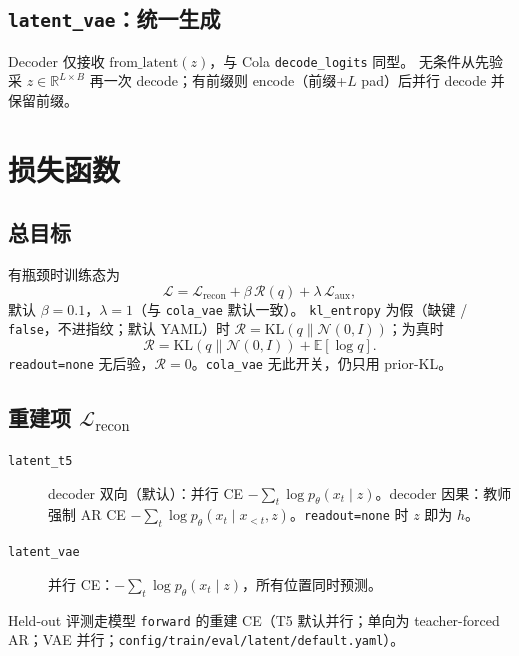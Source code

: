 \documentclass[UTF8,a4paper,11pt]{ctexart}
\begin{document}
\subsection{\texttt{latent\_vae}：统一生成}

Decoder 仅接收 $\mathrm{from\_latent}(z)$，与 Cola \texttt{decode\_logits} 同型。
无条件从先验采 $z\in\mathbb{R}^{L\times B}$ 再一次 decode；有前缀则 encode（前缀+$L$ pad）后并行 decode 并保留前缀。

\section{损失函数}

\subsection{总目标}

有瓶颈时训练态为
\begin{equation}
  \mathcal{L} = \mathcal{L}_{\mathrm{recon}} + \beta\,\mathcal{R}(q) + \lambda\, \mathcal{L}_{\mathrm{aux}},
\end{equation}
默认 $\beta{=}0.1$，$\lambda{=}1$（与 \texttt{cola\_vae} 默认一致）。
\texttt{kl\_entropy} 为假（缺键 / \texttt{false}，不进指纹；默认 YAML）时 $\mathcal{R}=\mathrm{KL}(q\| \mathcal{N}(0,I))$；为真时
\begin{equation}
  \mathcal{R}=\mathrm{KL}(q\| \mathcal{N}(0,I))+\mathbb{E}[\log q].
\end{equation}
\texttt{readout=none} 无后验，$\mathcal{R}=0$。\texttt{cola\_vae} 无此开关，仍只用 prior-KL。

\subsection{重建项 $\mathcal{L}_{\mathrm{recon}}$}

\begin{description}
  \item[\texttt{latent\_t5}] decoder 双向（默认）：并行 CE $-\sum_t \log p_\theta(x_t \mid z)$。decoder 因果：教师强制 AR CE $-\sum_t \log p_\theta(x_t \mid x_{<t}, z)$。\texttt{readout=none} 时 $z$ 即为 $h$。
  \item[\texttt{latent\_vae}] 并行 CE：$-\sum_t \log p_\theta(x_t \mid z)$，所有位置同时预测。
\end{description}

Held-out 评测走模型 \texttt{forward} 的重建 CE（T5 默认并行；单向为 teacher-forced AR；VAE 并行；\texttt{config/train/eval/latent/default.yaml}）。
\end{document}
